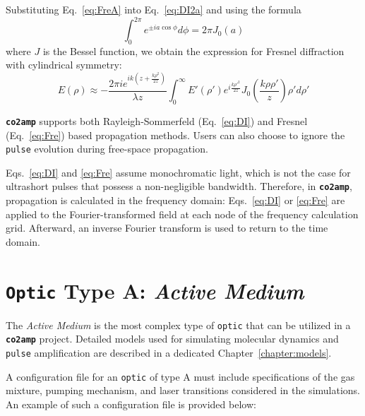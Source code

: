 \documentclass{report}
\begin{document}
Substituting Eq.~\ref{eq:FreA} into Eq.~\ref{eq:DI2a} and using the formula
\begin{equation} \label{eq:formula}
 \int_{0}^{2\pi} e^{\pm i a \cos\phi}  d\phi = 2 \pi J_0(a)
\end{equation}
where \(J\) is the Bessel function, we obtain the expression for Fresnel diffraction with cylindrical symmetry:
\begin{equation} \label{eq:Fre}
 E(\rho) \approx -\frac{2 \pi i e^{ik\left(z+\frac{k\rho^2}{2z}\right)}}{\lambda z}
 \int_0^\infty E'(\rho') e^{i\frac{k\rho'^2}{2z}} J_0 \left(\frac{k\rho\rho'}{z}\right) \rho' d\rho'
\end{equation}

\textbf{\texttt{co2amp}} supports both Rayleigh-Sommerfeld (Eq.~\ref{eq:DI}) and Fresnel (Eq.~\ref{eq:Fre}) based propagation methods. Users can also choose to ignore the \texttt{pulse} evolution during free-space propagation.

Eqs.~\ref{eq:DI} and \ref{eq:Fre} assume monochromatic light, which is not the case for ultrashort pulses that possess a non-negligible bandwidth. Therefore, in \textbf{\texttt{co2amp}}, propagation is calculated in the frequency domain: Eqs.~\ref{eq:DI} or \ref{eq:Fre} are applied to the Fourier-transformed field at each node of the frequency calculation grid. Afterward, an inverse Fourier transform is used to return to the time domain.



\section{\texttt{Optic} Type A: \textit{Active Medium}}
The \textit{Active Medium} is the most complex type of \texttt{optic} that can be utilized in a \textbf{\texttt{co2amp}} project. Detailed models used for simulating molecular dynamics and \texttt{pulse} amplification are described in a dedicated Chapter~\ref{chapter:models}.

A configuration file for an \texttt{optic} of type A must include specifications of the gas mixture, pumping mechanism, and laser transitions considered in the simulations. An example of such a configuration file is provided below:
\end{document}
